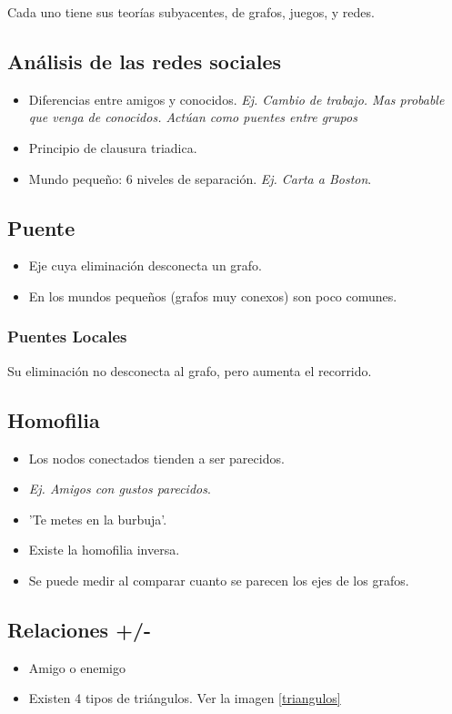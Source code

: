 \documentclass[titlepage,a4paper]{article}
\begin{document}
Cada uno tiene sus teorías subyacentes, de grafos, juegos, y redes.

\subsection{Análisis de las redes sociales}
\begin{itemize}
    \item Diferencias entre amigos y conocidos. \textit{Ej. Cambio de trabajo. Mas probable que venga de conocidos. Actúan como puentes entre grupos}
    \item Principio de clausura triadica.
    \item Mundo pequeño: 6 niveles de separación. \textit{Ej. Carta a Boston}.
\end{itemize}

\subsection*{Puente}
\begin{itemize}
    \item Eje cuya eliminación desconecta un grafo.
    \item En los mundos pequeños (grafos muy conexos) son poco comunes.
\end{itemize}

\subsubsection*{Puentes Locales}
Su eliminación no desconecta al grafo, pero aumenta el recorrido.

\subsection*{Homofilia}
\begin{itemize}
    \item Los nodos conectados tienden a ser parecidos.
    \item \textit{Ej. Amigos con gustos parecidos}.
    \item 'Te metes en la burbuja'.
    \item Existe la homofilia inversa.
    \item Se puede medir al comparar cuanto se parecen los ejes de los grafos.
\end{itemize}

\subsection*{Relaciones +/-}
\begin{itemize}
    \item Amigo o enemigo
    \item Existen 4 tipos de triángulos. Ver la imagen \ref{triangulos}
\end{itemize}
\end{document}
